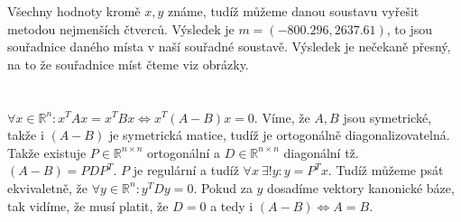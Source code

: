 \documentclass[12pt, a4paper]{article}
\begin{document}
Všechny hodnoty kromě $x,y$ známe, tudíž můžeme danou soustavu vyřešit metodou nejmenších čtverců. Výsledek je $m=(-800.296, 2637.61)$, to jsou souřadnice daného místa v naší souřadné soustavě. Výsledek je nečekaně přesný, na to že souřadnice míst čteme  viz obrázky.
\begin{figure}[H]
  \centering
  \hfill
\end{figure}
\section{}
\subsection{}
$\forall x \in \mathbb{R}^n : x^T A x = x^T B x \iff x^T (A-B) x = 0$. Víme, že $A,B$ jsou symetrické, takže i $(A-B)$ je symetrická matice, tudíž je ortogonálně diagonalizovatelná. Takže existuje $P \in \mathbb{R}^{n \times n}$ ortogonální a $D \in \mathbb{R}^{n \times n}$ diagonální tž. $(A-B) = PDP^T$. $P$ je regulární a tudíž $\forall x \ \exists! y: y=P^Tx$. Tudíž můžeme psát ekvivaletně, že $\forall y \in \mathbb{R}^n: y^T D y = 0$. Pokud za $y$ dosadíme vektory kanonické báze, tak vidíme, že musí platit, že $D = 0$ a tedy i $(A-B) \iff A = B$.
\end{document}
